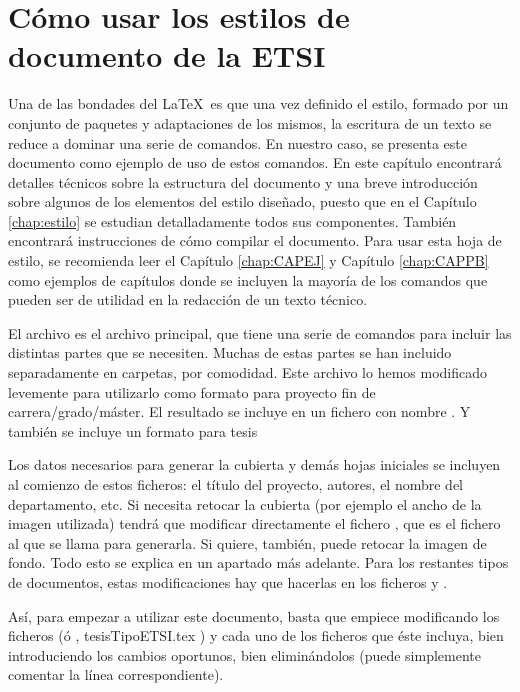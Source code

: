 \section{Cómo usar los  estilos de documento de la ETSI}\label{sec-00}

Una de las bondades del \LaTeX\ es que una vez definido el estilo, formado por un conjunto de paquetes 
y adaptaciones de los mismos, la escritura de un texto se reduce a dominar una serie de comandos. En 
nuestro caso, se presenta este documento como ejemplo de uso de estos comandos. En este capítulo 
encontrará detalles técnicos sobre la estructura del documento y una breve introducción sobre algunos 
de los elementos del estilo diseñado, puesto que en el Capítulo \ref{chap:estilo} se estudian 
detalladamente todos sus componentes. También encontrará instrucciones de cómo compilar el documento. 
Para usar esta hoja de estilo, se recomienda leer el Capítulo \ref{chap:CAPEJ} y Capítulo \ref{chap:CAPPB} 
como ejemplos de capítulos donde se incluyen la mayoría de los comandos que pueden ser de utilidad en 
la redacción de un texto técnico. 

El archivo  es el archivo principal, que tiene una serie de comandos para incluir las distintas partes que se necesiten. Muchas de estas partes se han incluido separadamente en carpetas, por comodidad. Este archivo lo hemos modificado levemente para utilizarlo como formato para proyecto fin de carrera/grado/máster. El resultado se incluye en un fichero con nombre . Y también se incluye un formato para tesis 

Los datos necesarios para generar la cubierta y demás hojas iniciales se incluyen al comienzo de estos ficheros: el título del proyecto, autores, el nombre del departamento, etc. Si necesita retocar la cubierta  (por ejemplo el ancho de la imagen utilizada)  tendrá que modificar directamente el fichero , que es el fichero al que se llama para generarla. Si quiere, también, puede retocar la imagen de fondo. Todo esto se explica en un apartado más adelante. Para los restantes tipos de documentos, estas modificaciones hay que hacerlas en los ficheros  y .

Así, para empezar a utilizar este documento, basta que empiece modificando los ficheros  (ó , {tesisTipoETSI.tex} ) y cada uno de los ficheros que éste incluya, bien introduciendo los cambios oportunos, bien eliminándolos (puede simplemente comentar la línea correspondiente).

